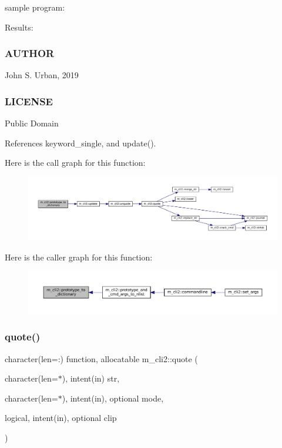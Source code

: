 sample program\+: \begin{DoxyVerb}Results:
\end{DoxyVerb}


\subsubsection*{A\+U\+T\+H\+OR}

John S. Urban, 2019 \subsubsection*{L\+I\+C\+E\+N\+SE}

Public Domain 

References keyword\+\_\+single, and update().

Here is the call graph for this function\+:\nopagebreak
\begin{figure}[H]
\begin{center}
\leavevmode
\includegraphics[width=350pt]{namespacem__cli2_a14896d00e509cbc32f4df993a8d6f75b_cgraph}
\end{center}
\end{figure}
Here is the caller graph for this function\+:\nopagebreak
\begin{figure}[H]
\begin{center}
\leavevmode
\includegraphics[width=350pt]{namespacem__cli2_a14896d00e509cbc32f4df993a8d6f75b_icgraph}
\end{center}
\end{figure}
\mbox{\label{namespacem__cli2_a63f81a2c027eb5f3e0a77167ac29fc73}} 
\subsubsection{\texorpdfstring{quote()}{quote()}}
{\footnotesize\ttfamily character(len=\+:) function, allocatable m\+\_\+cli2\+::quote (\begin{DoxyParamCaption}\item[{character(len=$\ast$), intent(in)}]{str,  }\item[{character(len=$\ast$), intent(in), optional}]{mode,  }\item[{logical, intent(in), optional}]{clip }\end{DoxyParamCaption})\hspace{0.3cm}{\ttfamily [private]}}




